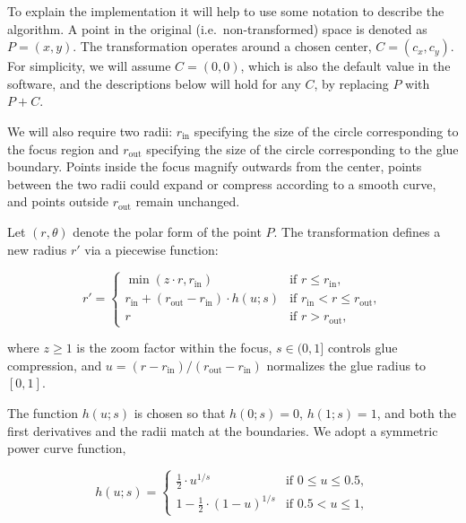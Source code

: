 To explain the implementation it will help to use some notation to describe the algorithm.
A point in the original (i.e.~non-transformed) space is denoted as \(P = (x, y)\). The transformation operates around a chosen center, \(C = (c_x, c_y)\). For simplicity, we will assume \(C = (0, 0)\), which is also the default value in the software, and the descriptions below will hold for any \(C\), by replacing \(P\) with \(P+C\).

We will also require two radii: \(r_{\text{in}}\) specifying the size of the circle corresponding to the focus region and \(r_{\text{out}}\) specifying the size of the circle corresponding to the glue boundary. Points inside the focus magnify outwards from the center, points between the two radii could expand or compress according to a smooth curve, and points outside \(r_{\text{out}}\) remain unchanged.

Let \((r, \theta)\) denote the polar form of the point \(P\). The transformation defines a new radius \(r'\) via a piecewise function:

\begin{equation} 
 r' = 
 \begin{cases}
   \min\left( z \cdot r, r_{\text{in}} \right) & \text{if } r \le r_{\text{in}}, \\
   r_{\text{in}} + (r_{\text{out}} - r_{\text{in}}) \cdot h(u; s) & \text{if } r_{\text{in}} < r \le r_{\text{out}}, \\
   r & \text{if } r > r_{\text{out}},
 \end{cases}
\end{equation}

where \(z \geq 1\) is the zoom factor within the focus, \(s \in (0, 1]\) controls glue compression, and \(u = { (r - r_{\text{in}}) }/{ (r_{\text{out}} - r_{\text{in}}) }\) normalizes the glue radius to \([0,1]\).

The function \(h(u; s)\) is chosen so that \(h(0; s) = 0\), \(h(1; s) = 1\), and both the first derivatives and the radii match at the boundaries. We adopt a symmetric power curve function,

\begin{equation} 
 h(u; s) = 
 \begin{cases}
   \tfrac{1}{2} \cdot u^{1/s} & \text{if } 0 \le u \le 0.5, \\
   1 - \tfrac{1}{2} \cdot (1 - u)^{1/s} & \text{if } 0.5 < u \le 1,
 \end{cases}
\end{equation}

